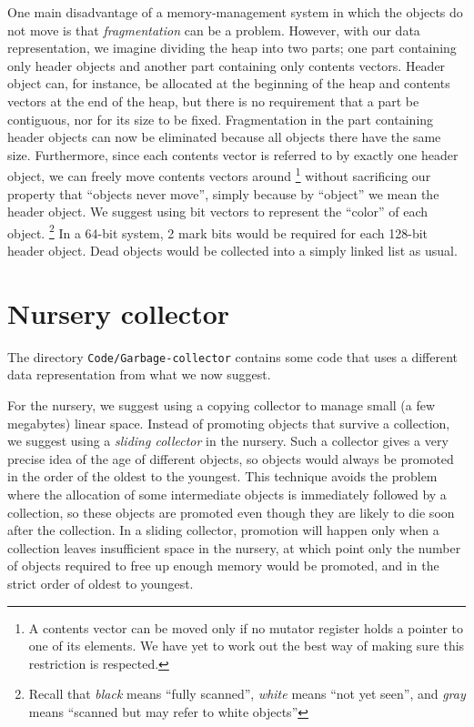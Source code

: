 One main disadvantage of a memory-management system in which the
objects do not move is that \emph{fragmentation} can be a problem.
However, with our data representation, we imagine dividing the heap
into two parts; one part containing only header objects and another
part containing only contents vectors.  Header object can, for
instance, be allocated at the beginning of the heap and contents
vectors at the end of the heap, but there is no requirement that a
part be contiguous, nor for its size to be fixed.  Fragmentation in
the part containing header objects can now be eliminated because all
objects there have the same size.  Furthermore, since each contents
vector is referred to by exactly one header object, we can freely move
contents vectors around%
\footnote{A contents vector can be moved only if no mutator register
  holds a pointer to one of its elements.  We have yet to work out the
  best way of making sure this restriction is respected.}  
without sacrificing our property that ``objects never move'', simply
because by ``object'' we mean the header object.  We suggest using bit
vectors to represent the ``color'' of each object.%
\footnote{Recall that \emph{black} means ``fully scanned'', \emph{white}
  means ``not yet seen'', and \emph{gray} means ``scanned but may
  refer to white objects''}
In a 64-bit system, 2 mark bits would be required for each 128-bit
header object.  Dead objects would be collected into a simply linked
list as usual. 

\section{Nursery collector}
The directory \texttt{Code/Garbage-collector} contains some code that
uses a different data representation from what we now suggest.  

For the nursery, we suggest using a copying collector to manage small
(a few megabytes) linear space.  Instead of promoting objects that
survive a collection, we suggest using a \emph{sliding collector} in
the nursery.  Such a collector gives a very precise idea of the age of
different objects, so objects would always be promoted in the order of
the oldest to the youngest.  This technique avoids the problem where
the allocation of some intermediate objects is immediately followed by
a collection, so these objects are promoted even though they are
likely to die soon after the collection.  In a sliding collector,
promotion will happen only when a collection leaves insufficient space
in the nursery, at which point only the number of objects required to
free up enough memory would be promoted, and in the strict order of
oldest to youngest.

